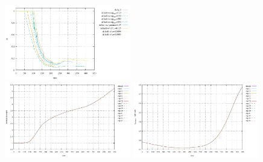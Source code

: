 \begin{center}
\includegraphics[width=5.5cm]{python_codes/fieldstone_95/results/dt}\\
\includegraphics[width=5.5cm]{python_codes/fieldstone_95/results/length_interface}
\includegraphics[width=5.5cm]{python_codes/fieldstone_95/results/right}
\end{center}


